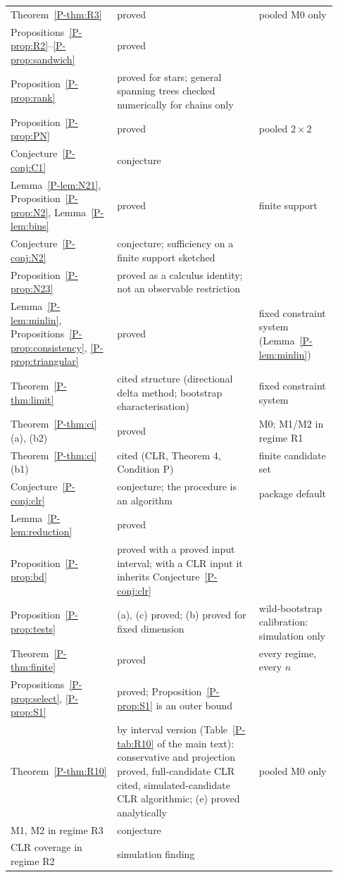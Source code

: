 {\begin{longtable}{@{}L{0.30\linewidth}L{0.40\linewidth}L{0.22\linewidth}@{}}
Theorem~\ref{P-thm:R3} & proved & pooled M0 only \\
Propositions~\ref{P-prop:R2}--\ref{P-prop:sandwich} & proved & \\
Proposition~\ref{P-prop:rank} & proved for stars; general spanning trees checked numerically for chains only & \\
Proposition~\ref{P-prop:PN} & proved & pooled $2\times2$ \\
Conjecture~\ref{P-conj:C1} & conjecture & \\
Lemma~\ref{P-lem:N21}, Proposition~\ref{P-prop:N2}, Lemma~\ref{P-lem:bins} & proved & finite support \\
Conjecture~\ref{P-conj:N2} & conjecture; sufficiency on a finite support sketched & \\
Proposition~\ref{P-prop:N23} & proved as a calculus identity; not an observable restriction & \\
Lemma~\ref{P-lem:minlin}, Propositions~\ref{P-prop:consistency}, \ref{P-prop:triangular} & proved & fixed constraint system (Lemma~\ref{P-lem:minlin}) \\
Theorem~\ref{P-thm:limit} & cited structure (directional delta method; bootstrap characterisation) & fixed constraint system \\
Theorem~\ref{P-thm:ci}(a), (b2) & proved & M0; M1/M2 in regime R1 \\
Theorem~\ref{P-thm:ci}(b1) & cited (CLR, Theorem 4, Condition P) & finite candidate set \\
Conjecture~\ref{P-conj:clr} & conjecture; the procedure is an algorithm & package default \\
Lemma~\ref{P-lem:reduction} & proved & \\
Proposition~\ref{P-prop:bd} & proved with a proved input interval; with a CLR input it inherits Conjecture~\ref{P-conj:clr} & \\
Proposition~\ref{P-prop:tests} & (a), (c) proved; (b) proved for fixed dimension & wild-bootstrap calibration: simulation only \\
Theorem~\ref{P-thm:finite} & proved & every regime, every $n$ \\
Propositions~\ref{P-prop:select}, \ref{P-prop:S1} & proved; Proposition~\ref{P-prop:S1} is an outer bound & \\
Theorem~\ref{P-thm:R10} & by interval version (Table~\ref{P-tab:R10} of the main text): conservative and projection proved, full-candidate CLR cited, simulated-candidate CLR algorithmic; (e) proved analytically & pooled M0 only \\
M1, M2 in regime R3 & conjecture & \\
CLR coverage in regime R2 & simulation finding & \\
\bottomrule
\end{longtable}
}
